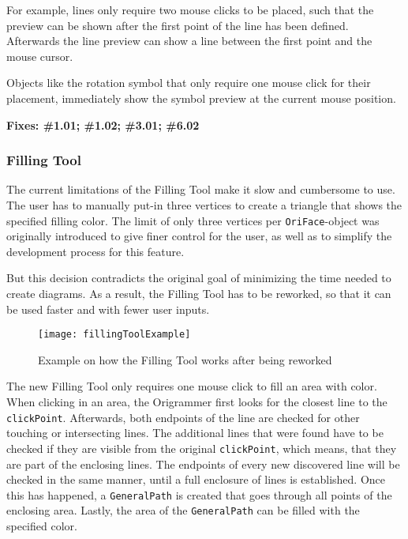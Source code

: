 For example, lines only require two mouse clicks to be placed, such that the preview can be shown after the first point of the line has been defined. Afterwards the line preview can show a line between the first point and the mouse cursor.

Objects like the rotation symbol that only require one mouse click for their placement, immediately show the symbol preview at the current mouse position.

\textbf{Fixes: \#1.01; \#1.02; \#3.01; \#6.02}

\newpage

\subsubsection{Filling Tool}

The current limitations of the Filling Tool make it slow and cumbersome to use. The user has to manually put-in three vertices to create a triangle that shows the specified filling color. The limit of only three vertices per \texttt{OriFace}-object was originally introduced to give finer control for the user, as well as to simplify the development process for this feature.

But this decision contradicts the original goal of minimizing the time needed to create diagrams. As a result, the Filling Tool has to be reworked, so that it can be used faster and with fewer user inputs.

\begin{figure}[htbp]
	\centering
	\texttt{[image: fillingToolExample]}
	\caption{Example on how the Filling Tool works after being reworked}
	\label{fig:fillingToolExample}
\end{figure}
\noindent The new Filling Tool only requires one mouse click to fill an area with color. When clicking in an area, the Origrammer first looks for the closest line to the \texttt{clickPoint}. Afterwards, both endpoints of the line are checked for other touching or intersecting lines. The additional lines that were found have to be checked if they are visible from the original \texttt{clickPoint}, which means, that they are part of the enclosing lines. The endpoints of every new discovered line will be checked in the same manner, until a full enclosure of lines is established. Once this has happened, a \texttt{GeneralPath} is created that goes through all points of the enclosing area. Lastly, the area of the \texttt{GeneralPath} can be filled with the specified color.

